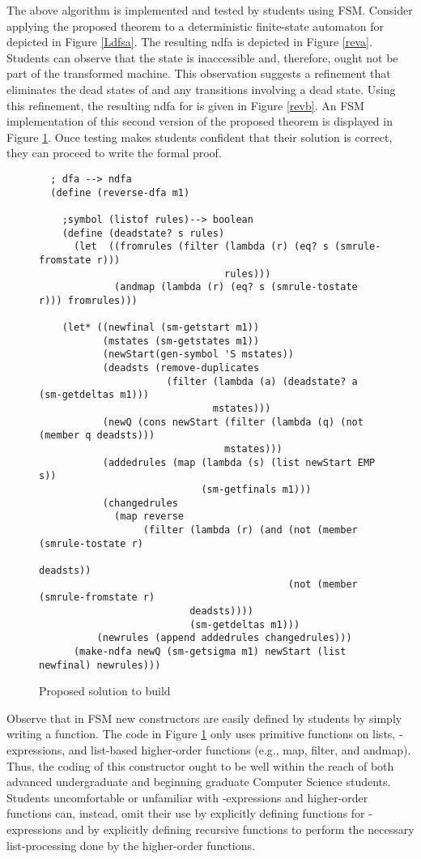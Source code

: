 \documentclass{eptcs}
\begin{document}
The above algorithm is implemented and tested by students using \textsf{FSM}. Consider applying the proposed theorem to a deterministic finite-state automaton for  depicted in Figure \ref{Ldfsa}. The resulting \textsf{ndfa} is depicted in Figure \ref{reva}. Students can observe that the state  is inaccessible and, therefore, ought not be part of the transformed machine. This observation suggests a refinement that eliminates the dead states of  and any transitions involving a dead state. Using this refinement, the resulting \textsf{ndfa} for  is given in Figure \ref{revb}. An \textsf{FSM} implementation of this second version of the proposed theorem is displayed in Figure \ref{mrev}. Once testing makes students confident that their solution is correct, they can proceed to write the formal proof.

\begin{figure}[t]
\begin{verbatim}
  ; dfa --> ndfa
  (define (reverse-dfa m1)

    ;symbol (listof rules)--> boolean
    (define (deadstate? s rules)
      (let  ((fromrules (filter (lambda (r) (eq? s (smrule-fromstate r)))
                                rules)))
             (andmap (lambda (r) (eq? s (smrule-tostate r))) fromrules)))

    (let* ((newfinal (sm-getstart m1))
           (mstates (sm-getstates m1))
           (newStart(gen-symbol 'S mstates))
           (deadsts (remove-duplicates
                      (filter (lambda (a) (deadstate? a (sm-getdeltas m1)))
                              mstates)))
           (newQ (cons newStart (filter (lambda (q) (not (member q deadsts)))
                                mstates)))
           (addedrules (map (lambda (s) (list newStart EMP s))
                            (sm-getfinals m1)))
           (changedrules
             (map reverse
                  (filter (lambda (r) (and (not (member (smrule-tostate r)
                                                        deadsts))
                                           (not (member (smrule-fromstate r)
                          deadsts))))
                          (sm-getdeltas m1)))
          (newrules (append addedrules changedrules)))
      (make-ndfa newQ (sm-getsigma m1) newStart (list newfinal) newrules)))
\end{verbatim}
\caption{Proposed solution to build }
\label{mrev}
\end{figure}

Observe that in \textsf{FSM} new constructors are easily defined by students by simply writing a function. The code in Figure \ref{mrev} only uses primitive functions on lists, -expressions, and list-based higher-order functions (e.g., \textsf{map}, \textsf{filter}, and \textsf{andmap}). Thus, the coding of this constructor ought to be well within the reach of both advanced undergraduate and beginning graduate Computer Science students. Students uncomfortable or unfamiliar with -expressions and higher-order functions can, instead, omit their use by explicitly defining functions for -expressions and by explicitly defining recursive functions to perform the necessary list-processing done by the higher-order functions.
\end{document}
